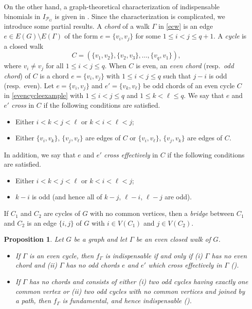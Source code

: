 \documentclass[12pt]{amsart}
\newtheorem{prop}[thm]{Proposition}
\theoremstyle{definition}
\numberwithin{thm}{section}
\numberwithin{equation}{section}
\def\epoly{{\mathcal P}_G}
\begin{document}
On the other hand, a graph-theoretical characterization of indispensable binomials in $I_{\epoly}$ is given in \cite[Theorem 4.14]{RTT}.
Since the characterization is complicated, we introduce some partial results.
A {\em chord} of a walk $\Gamma$ in \eqref{ecw} is an edge $e \in E(G) \setminus E(\Gamma)$ of the form $e=\{v_i,v_j\}$ for some $1 \le i < j \le q+1$.
A {\it cycle} is a closed walk 
\begin{equation} \label{evencycleexample}    
    C =(\{v_1,v_2\}, \{v_2,v_3\}, \dots,\{v_q,v_{1}\}),
    \end{equation}
where $v_i \ne v_j$ for all $1 \le i < j \le q$.
When $C$ is even, an {\em even chord} (resp.~{\em odd chord}) of $C$ is a chord $e=\{v_i,v_j\}$
with $1 \le i < j \le q$ such that $j-i$ is odd (resp.~even).
Let $e=\{v_i,v_j\}$ and $e'=\{v_k,v_\ell\}$ be odd chords of an even cycle $C$ in \eqref{evencycleexample}
with $1 \le i < j \le q$ and $1 \le k < \ell \le q$.
We say that $e$ and $e'$ {\em cross} in $C$ if the following conditions are satisfied.
\begin{itemize}
    \item 
    Either $i < k < j < \ell$ or $k < i < \ell < j$; 
    \item 
    Either $\{v_i,v_k\}$, $\{v_j,v_\ell\}$ are edges of $C$
or $\{v_i,v_\ell\}$, $\{v_j,v_k\}$ are edges of $C$.
\end{itemize}
In addition, we say that $e$ and $e'$ {\em cross effectively} in $C$ if the following conditions are satisfied.
\begin{itemize}
    \item 
    Either $i < k < j < \ell$ or $k < i < \ell < j$; 
    \item 
    $k-i$ is odd (and hence all of $k-j$, $\ell-i$, $\ell -j$ are odd).
\end{itemize}
If $C_1$ and $C_2$ are cycles of $G$ with no common vertices, then a {\em bridge} between $C_1$ and $C_2$ is an edge $\{i,j\}$ of $G$ with $i \in V(C_1)$ and $j \in V(C_2)$.

\begin{prop} \label{ep:indispensable}
Let $G$ be a graph and let $\Gamma$ be an even closed walk of $G$.
\begin{itemize}
    \item[(a)] 
    If $\Gamma$ is an even cycle, then $f_\Gamma$ is indispensable
if and only if {\rm (i)} $\Gamma$ has no even chord and {\rm (ii)} $\Gamma$ has no odd chords $e$ and $e'$ which
cross effectively in $\Gamma$ {\rm (}\cite[Theorem 2.3]{OHindispensable}{\rm )}.
\item[(b)]
If $\Gamma$ has no chords and consists of either {\rm (i)} two odd cycles having exactly one common vertex or
{\rm (ii)} two odd cycles with no common vertices and joined by a path, then $f_\Gamma$ is fundamental, and hence indispensable
 {\rm (}\cite[Theorem 2.2]{RTT}{\rm )}.
\end{itemize}
\end{prop}
\end{document}
